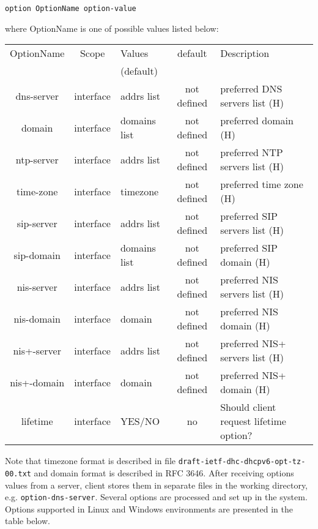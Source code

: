 \begin{verbatim}
option OptionName option-value
\end{verbatim}

where OptionName is one of possible values listed below:

\begin{center}
\begin{tabular}{|c|c|>{\centering}p{1.7cm}<{}|c|p{6cm}|}
\hline
OptionName     & Scope    & Values      &default& Description \\
               &          & (default)   &       & \\
\hline
dns-server     & interface& addrs list  & not defined & preferred DNS servers list (H) \\
domain         & interface&domains list & not defined & preferred domain (H)\\
ntp-server     & interface& addrs list  & not defined & preferred NTP servers list (H)\\
time-zone      & interface& timezone    & not defined & preferred time zone (H)\\
sip-server     & interface& addrs list  & not defined & preferred SIP servers list (H)\\
sip-domain     & interface&domains list & not defined & preferred SIP domain (H)\\
nis-server     & interface& addrs list  & not defined & preferred NIS servers list (H)\\
nis-domain     & interface& domain      & not defined & preferred NIS domain (H)\\
nis+-server    & interface& addrs list  & not defined & preferred NIS+ servers list (H)\\
nis+-domain    & interface& domain      & not defined & preferred NIS+ domain (H)\\
lifetime       & interface& YES/NO      & no    & Should client request lifetime option? \\
\hline
\end{tabular}
\end{center}

Note that timezone format is described in file \verb+draft-ietf-dhc-dhcpv6-opt-tz-00.txt+
and domain format is described in RFC 3646. After receiving options
values from a server, client stores them in separate files in the
working directory, e.g. \verb+option-dns-server+. Several options
are processed and set up in the system. Options supported in Linux and
Windows environments are presented in the table below.

